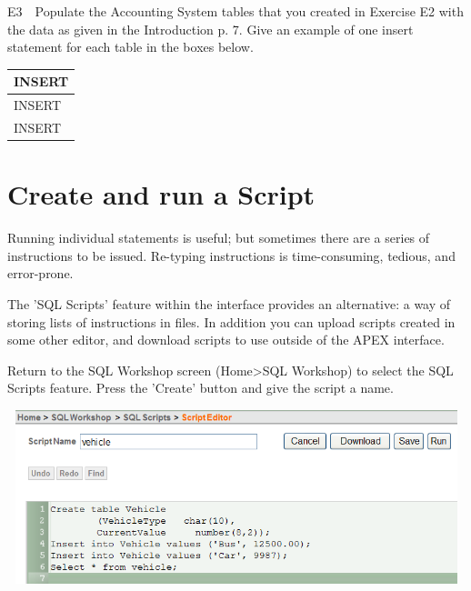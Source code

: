 E3\ \ Populate the Accounting System tables that you created in Exercise E2 with the data as given in the Introduction p. 7.  Give an example of one insert statement for each table in the boxes below.

\begin{flushleft}
\tablefirsthead{}
\tablehead{}
\tabletail{}
\tablelasttail{}
\begin{supertabular}{|m{14.663cm}|}
\hline
INSERT

\\\hline
INSERT

\\\hline
INSERT

\\\hline
\end{supertabular}
\end{flushleft}

\section{Create and run a Script}
Running individual statements is useful; but sometimes there are a series of instructions to be issued. Re-typing instructions is time-consuming, tedious, and error-prone.

The 'SQL Scripts' feature within the interface provides an alternative: a way of storing lists of instructions in files.  In addition you can upload scripts created in some other editor, and download scripts to use outside of the APEX interface.

Return to the SQL Workshop screen (Home{\textgreater}SQL Workshop) to select the SQL Scripts feature. Press the 'Create' button and give the script a name.



\begin{center}
  
\includegraphics[width=14.727cm,height=5.068cm]{images/img (43).png}

\end{center}


